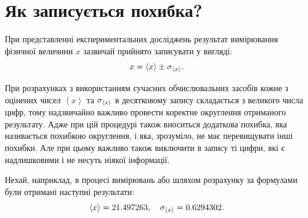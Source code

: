 \documentclass{LabBook}
\begin{document}
%
%
%
%

\chapter{Як записується похибка?}


При представленні експериментальних досліджень результат вимірювання фізичної величини $x$ зазвичай прийнято записувати у вигляді:
\begin{equation}\label{eq:result}
	x = \left\langle x \right\rangle \pm \sigma_{\left\langle x \right\rangle}.
\end{equation}

При розрахунках з використанням сучасних обчислювальних засобів кожне з оцінених чисел $\left\langle x \right\rangle$ та $\sigma_{\left\langle x \right\rangle}$ в десятковому запису складається з великого числа цифр, тому надзвичайно важливо провести коректне округлення отриманого результату. Адже при цій процедурі також вноситься додаткова похибка, яка називається похибкою округлення, і яка, зрозуміло, не має перевищувати інші похибки. Але при цьому важливо також виключити в запису ті цифри, які є надлишковими і не несуть ніякої інформації.

Нехай, наприклад, в процесі вимірювань або шляхом розрахунку за формулами були отримані наступні результати:
\begin{equation*}
	\left\langle x \right\rangle = 21.497263, \quad \sigma_{\left\langle x \right\rangle} = 0.6294302.
\end{equation*}
\end{document}
